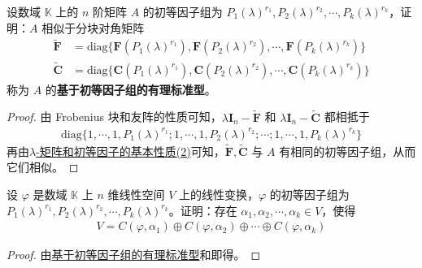 \documentclass[../../main.tex]{subfiles}%
\begin{document}
\begin{theorem}[基于初等因子组的有理标准型]\label{theorem:基于初等因子组的有理标准型}
设数域 $\mathbb{K}$ 上的 $n$ 阶矩阵 $A$ 的初等因子组为 $P_1(\lambda)^{r_1},P_2(\lambda)^{r_2},\cdots,P_k(\lambda)^{r_k}$，证明：$A$ 相似于分块对角矩阵
\begin{align*}
\widetilde{\boldsymbol{F}}&=\mathrm{diag}\{\boldsymbol{F}(P_1(\lambda)^{r_1}),\boldsymbol{F}(P_2(\lambda)^{r_2}),\cdots,\boldsymbol{F}(P_k(\lambda)^{r_k})\}\\
\widetilde{\boldsymbol{C}}&=\mathrm{diag}\{\boldsymbol{C}(P_1(\lambda)^{r_1}),\boldsymbol{C}(P_2(\lambda)^{r_2}),\cdots,\boldsymbol{C}(P_k(\lambda)^{r_k})\}
\end{align*}
称为 $A$ 的\textbf{基于初等因子组的有理标准型}。
\end{theorem}
\begin{proof}
由 Frobenius 块和友阵的性质可知，$\lambda\boldsymbol{I}_n - \widetilde{\boldsymbol{F}}$ 和 $\lambda\boldsymbol{I}_n - \widetilde{\boldsymbol{C}}$ 都相抵于
\begin{align*}
\mathrm{diag}\{1,\cdots,1,P_1(\lambda)^{r_1};1,\cdots,1,P_2(\lambda)^{r_2};\cdots;1,\cdots,1,P_k(\lambda)^{r_k}\}
\end{align*}
再由\hyperref[theorem:lambda-矩阵和初等因子的基本性质]{$\lambda$-矩阵和初等因子的基本性质(2)}可知，$\widetilde{\boldsymbol{F}},\widetilde{\boldsymbol{C}}$ 与 $A$ 有相同的初等因子组，从而它们相似。
\end{proof}

\begin{theorem}\label{theorem:基于初等因子组的循环子空间之和分解}
设 $\varphi$ 是数域 $\mathbb{K}$ 上 $n$ 维线性空间 $V$ 上的线性变换，$\varphi$ 的初等因子组为 $P_1(\lambda)^{r_1},P_2(\lambda)^{r_2},\cdots,P_k(\lambda)^{r_k}$。证明：存在 $\alpha_1,\alpha_2,\cdots,\alpha_k\in V$，使得
\begin{align*}
V = C(\varphi,\alpha_1)\oplus C(\varphi,\alpha_2)\oplus\cdots\oplus C(\varphi,\alpha_k)
\end{align*}
\end{theorem}
\begin{proof}
由\hyperref[theorem:基于初等因子组的有理标准型]{基于初等因子组的有理标准型}和即得。
\end{proof}
\end{document}
